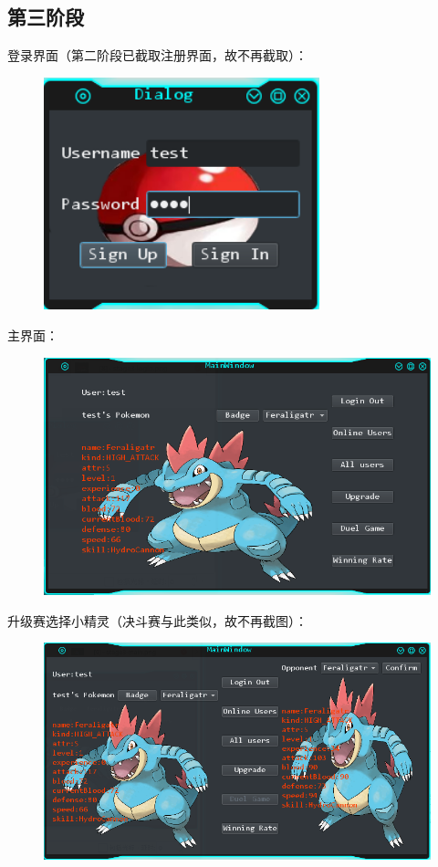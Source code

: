 \documentclass{ctexart}
\begin{document}
\subsection{第三阶段}
登录界面（第二阶段已截取注册界面，故不再截取）：
\begin{figure}[H]
  \centering
  \includegraphics[width=8cm]{stage3-login.png}
\end{figure}
\pagebreak[4]
主界面：
\begin{figure}[H]
  \centering
  \includegraphics[width=15cm]{stage3-main.png}
\end{figure}
升级赛选择小精灵（决斗赛与此类似，故不再截图）：
\begin{figure}[H]
  \centering
  \includegraphics[width=15cm]{stage3-upgrade.png}
\end{figure}
\end{document}
